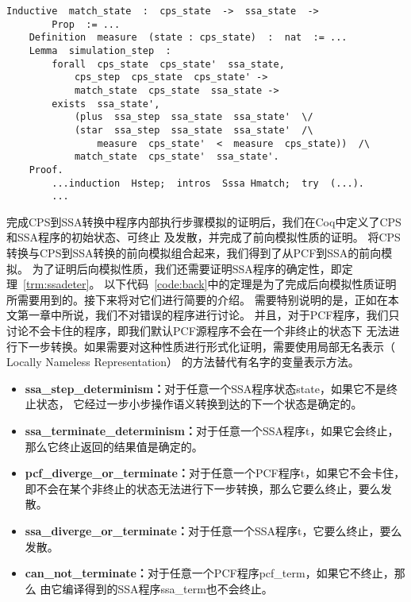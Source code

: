 \vspace{1ex}
\begin{lstlisting}[language=Coq, caption=Coq中CPS到SSA程序内部执行步骤模拟的证明, label=code:cpsssav]  
    Inductive  match_state  :  cps_state  ->  ssa_state  ->  
        Prop  := ...
    Definition  measure  (state : cps_state)  :  nat  := ...
    Lemma  simulation_step  :
        forall  cps_state  cps_state'  ssa_state,
            cps_step  cps_state  cps_state' ->
            match_state  cps_state  ssa_state ->
        exists  ssa_state',  
            (plus  ssa_step  ssa_state  ssa_state'  \/
            (star  ssa_step  ssa_state  ssa_state'  /\  
                measure  cps_state'  <  measure  cps_state))  /\
            match_state  cps_state'  ssa_state'.          
    Proof.
        ...induction  Hstep;  intros  Sssa Hmatch;  try  (...).
        ...
\end{lstlisting}

完成CPS到SSA转换中程序内部执行步骤模拟的证明后，我们在Coq中定义了CPS和SSA程序的初始状态、可终止
及发散，并完成了前向模拟性质的证明。
将CPS转换与CPS到SSA转换的前向模拟组合起来，我们得到了从PCF到SSA的前向模拟。
为了证明后向模拟性质，我们还需要证明SSA程序的确定性，即定理~\ref{trm:ssadeter}。
以下代码~\ref{code:back}中的定理是为了完成后向模拟性质证明所需要用到的。接下来将对它们进行简要的介绍。
需要特别说明的是，正如在本文第一章中所说，我们不对错误的程序进行讨论。
并且，对于PCF程序，我们只讨论不会卡住的程序，即我们默认PCF源程序不会在一个非终止的状态下
无法进行下一步转换。如果需要对这种性质进行形式化证明，需要使用局部无名表示（ Locally Nameless Representation）
的方法替代有名字的变量表示方法。

\begin{itemize}
    \item \textbf{ssa\_step\_determinism：}对于任意一个SSA程序状态state，如果它不是终止状态，
        它经过一步小步操作语义转换到达的下一个状态是确定的。
    \item \textbf{ssa\_terminate\_determinism：}对于任意一个SSA程序t，如果它会终止，
        那么它终止返回的结果值是确定的。
    \item \textbf{pcf\_diverge\_or\_terminate：}对于任意一个PCF程序t，如果它不会卡住，
        即不会在某个非终止的状态无法进行下一步转换，那么它要么终止，要么发散。
    \item \textbf{ssa\_diverge\_or\_terminate：}对于任意一个SSA程序t，它要么终止，要么发散。
    \item \textbf{can\_not\_terminate：}对于任意一个PCF程序pcf\_term，如果它不终止，那么
        由它编译得到的SSA程序ssa\_term也不会终止。
\end{itemize}

